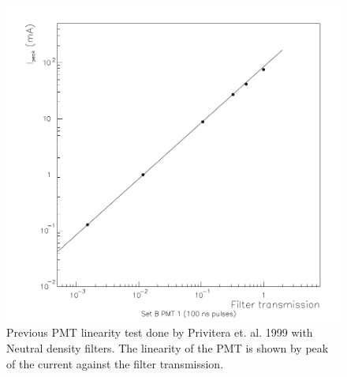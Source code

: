 \begin{figure}
\centering
\includegraphics[width=\textwidth]{chapters/graphs/PMTchar/pmt_linearity_100V_privitera.png}
\caption{Previous PMT linearity test done by Privitera et. al. 1999 with Neutral density filters. The linearity of the PMT is shown by peak of the current against the filter transmission. }
\end{figure}

